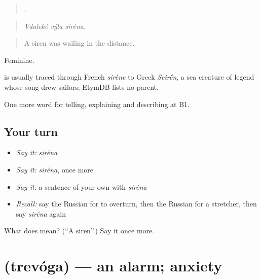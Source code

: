 \begin{quote}
  .
\end{quote}

\begin{quote}
\emph{Vdaleké výla siréna.}
\end{quote}

\begin{quote}
A siren was wailing in the distance.
\end{quote}

Feminine.

\begin{cousinweb}
\emph{} is usually traced through French \emph{sirène} to Greek \emph{Seir\'{\={e}}n}, a sea creature of legend whose song drew sailors; EtymDB lists no parent.
\end{cousinweb}

\begin{grammarlens}[title={What you've built}]
One more word for telling, explaining and describing at B1.
\end{grammarlens}

\subsection*{Your turn}
\begin{itemize}
\raggedright
  \item \emph{Say it:} \emph{siréna}
  \item \emph{Say it:} \emph{siréna}, once more
  \item \emph{Say it:} a sentence of your own with \emph{siréna}
  \item \emph{Recall:} say the Russian for to overturn, then the Russian for a stretcher, then say \emph{siréna} again
\end{itemize}

\begin{tcolorbox}[breakable,colback=teal!4,colframe=teal!35!black,title={Before you move on}]
What does  mean? (\textquotedblleft{}A siren\textquotedblright{}.) Say it once more.
\end{tcolorbox}
\section[\texorpdfstring{\ru{тревога} (trevóga)}{тревога (trevóga)}]{ (trevóga) — an alarm; anxiety}

\label{lesson:RU-C299-trevoga}



